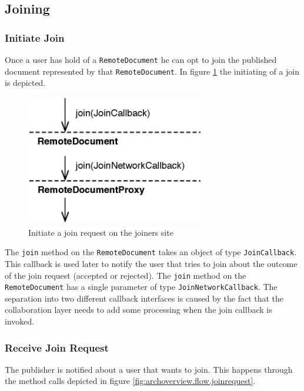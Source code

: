 \subsection{Joining}

\subsubsection{Initiate Join}
\label{sect:archoverview.flow.initiatejoin}
Once a user has hold of a \texttt{RemoteDocument} he can opt to join the
published document represented by that \texttt{RemoteDocument}. In figure
\ref{fig:archoverview.flow.joininitiate} the initiating of a join
is depicted.

\begin{figure}[H]
 \centering
 \includegraphics[width=7.80cm,height=5.72cm]{../images/finalreport/architecture_flows/join_initiate.eps}
 \caption{Initiate a join request on the joiners site}
 \label{fig:archoverview.flow.joininitiate}
\end{figure}

The \texttt{join} method on the \texttt{RemoteDocument} takes an object of
type \texttt{JoinCallback}. This callback is used later to notify the
user that tries to join about the outcome of the join request (accepted or
rejected). The \texttt{join} method on the \texttt{RemoteDocument} has
a single parameter of type \texttt{JoinNetworkCallback}. The separation
into two different callback interfaces is caused by the fact that the
collaboration layer needs to add some processing when the join callback
is invoked.

\subsubsection{Receive Join Request}
The publisher is notified about a user that wants to join. This happens
through the method calls depicted in figure 
\ref{fig:archoverview.flow.joinrequest}.

